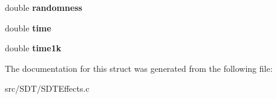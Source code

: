 \begin{DoxyCompactItemize}
\item 
\hypertarget{struct_s_d_t_reverb_a5f3b66dbd20777fc167adda1721841c8}{}double {\bfseries randomness}\label{struct_s_d_t_reverb_a5f3b66dbd20777fc167adda1721841c8}

\item 
\hypertarget{struct_s_d_t_reverb_ab2d5aa7fce1a14d8bddfb2c333ea9679}{}double {\bfseries time}\label{struct_s_d_t_reverb_ab2d5aa7fce1a14d8bddfb2c333ea9679}

\item 
\hypertarget{struct_s_d_t_reverb_ab9d17ebb75adbfb1b217b5308f08110b}{}double {\bfseries time1k}\label{struct_s_d_t_reverb_ab9d17ebb75adbfb1b217b5308f08110b}

\end{DoxyCompactItemize}


The documentation for this struct was generated from the following file\+:\begin{DoxyCompactItemize}
\item 
src/\+S\+D\+T/S\+D\+T\+Effects.\+c\end{DoxyCompactItemize}
